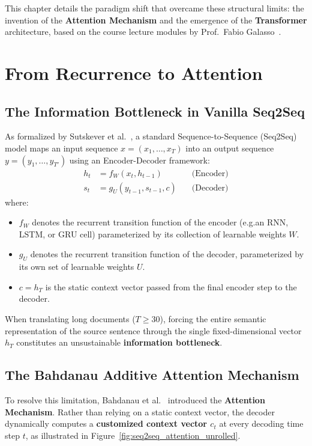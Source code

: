 This chapter details the paradigm shift that overcame these structural limits: the invention of the \textbf{Attention Mechanism} and the emergence of the \textbf{Transformer} architecture, based on the course lecture modules by Prof.~Fabio Galasso~\cite{galasso2025seqmodels2}.


\section{From Recurrence to Attention}

\subsection{The Information Bottleneck in Vanilla Seq2Seq}

As formalized by Sutskever et al.~\cite{sutskever2014sequence}, a standard Sequence-to-Sequence (Seq2Seq) model maps an input sequence $x = (x_1, \dots, x_T)$ into an output sequence $y = (y_1, \dots, y_{T'})$ using an Encoder-Decoder framework:
\begin{align}
    h_t &= f_W(x_t, h_{t-1}) \quad &\text{(Encoder)} \\
    s_t &= g_U(y_{t-1}, s_{t-1}, c) \quad &\text{(Decoder)}
\end{align}
where:
\begin{itemize}[leftmargin=*]
    \item $f_W$ denotes the recurrent transition function of the encoder (e.g.\@ an RNN, LSTM, or GRU cell) parameterized by its collection of learnable weights $W$.
    \item $g_U$ denotes the recurrent transition function of the decoder, parameterized by its own set of learnable weights $U$.
    \item $c = h_T$ is the static context vector passed from the final encoder step to the decoder.
\end{itemize}
When translating long documents ($T \ge 30$), forcing the entire semantic representation of the source sentence through the single fixed-dimensional vector $h_T$ constitutes an unsustainable \textbf{information bottleneck}.

\subsection{The Bahdanau Additive Attention Mechanism}

To resolve this limitation, Bahdanau et al.~\cite{bahdanau2015neural} introduced the \textbf{Attention Mechanism}. Rather than relying on a static context vector, the decoder dynamically computes a \textbf{customized context vector $c_t$} at every decoding time step $t$, as illustrated in Figure~\ref{fig:seq2seq_attention_unrolled}.

